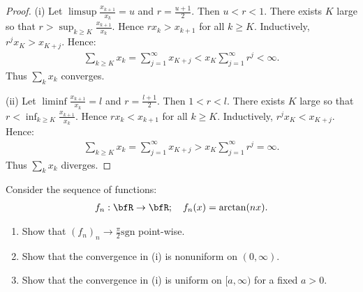 \documentclass[10pt,twoside,openany]{memoir}
\begin{document}
        \begin{proof}
            (i) Let $\limsup \frac{x_{k+1}}{x_k} = u$ and $r = \frac{u+1}{2}$. Then $u < r < 1$. There exists $K$ large so that $r > \sup_{k \geq K}\frac{x_{k+1}}{x_k}$. Hence $rx_k > x_{k+1}$ for all $k \geq K$. Inductively, $r^jx_K > x_{K+j}$. Hence:
                \begin{equation*}
                \begin{split}
                    \sum_{k \geq K}x_{k} = \sum_{j = 1}^\infty x_{K+j} < x_K \sum_{j = 1}^\infty r^j < \infty.
                \end{split}
                \end{equation*}
            Thus $\sum_{k}x_k$ converges.

            (ii) Let $\liminf \frac{x_{k+1}}{x_k} = l$ and $r = \frac{l+1}{2}$. Then $1 < r < l$. There exists $K$ large so that $r < \inf_{k \geq K}\frac{x_{k+1}}{x_k}$. Hence $rx_k < x_{k+1}$ for all $k \geq K$. Inductively, $r^jx_K < x_{K+j}$. Hence:
                \begin{equation*}
                \begin{split}
                    \sum_{k \geq K}x_{k} = \sum_{j = 1}^\infty x_{K+j} > x_K \sum_{j = 1}^\infty r^j = \infty.
                \end{split}
                \end{equation*}
            Thus $\sum_{k}x_k$ diverges.
        \end{proof}
    \begin{exercise}
        Consider the sequence of functions:
            \begin{equation*}
            \begin{split}
                f_n: \bfR \rightarrow \bfR; \hspace{10pt} f_n(x) = \arctan(nx).
            \end{split}
            \end{equation*}
            \begin{enumerate}[label = (\roman*)]
                \item Show that $(f_n)_n \rightarrow \frac{\pi}{2}\text{sgn}$ point-wise.
                \item Show that the convergence in (i) is nonuniform on $(0,\infty)$.
                \item Show that the convergence in (i) is uniform on $[a,\infty)$ for a fixed $a > 0$.
            \end{enumerate}
    \end{exercise} 
\end{document}
